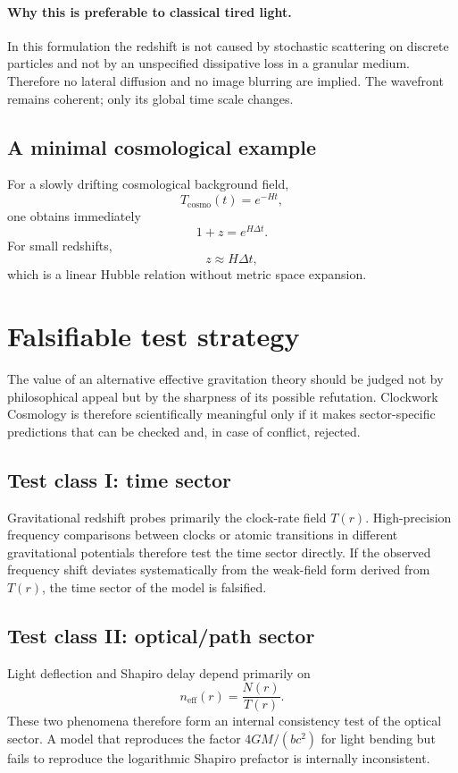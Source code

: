 \documentclass[11pt,a4paper]{article}
\begin{document}
\paragraph{Why this is preferable to classical tired light.}
In this formulation the redshift is not caused by stochastic scattering on discrete particles and not by an unspecified dissipative loss in a granular medium. Therefore no lateral diffusion and no image blurring are implied. The wavefront remains coherent; only its global time scale changes.

\subsection{A minimal cosmological example}
For a slowly drifting cosmological background field,
\begin{equation}
 T_{\text{cosmo}}(t)=e^{-Ht},
\end{equation}
one obtains immediately
\begin{equation}
 1+z = e^{H\Delta t}.
\end{equation}
For small redshifts,
\begin{equation}
 z \approx H\Delta t,
\end{equation}
which is a linear Hubble relation without metric space expansion.

\section{Falsifiable test strategy}
The value of an alternative effective gravitation theory should be judged not by philosophical appeal but by the sharpness of its possible refutation. Clockwork Cosmology is therefore scientifically meaningful only if it makes sector-specific predictions that can be checked and, in case of conflict, rejected.

\subsection{Test class I: time sector}
Gravitational redshift probes primarily the clock-rate field $T(r)$. High-precision frequency comparisons between clocks or atomic transitions in different gravitational potentials therefore test the time sector directly. If the observed frequency shift deviates systematically from the weak-field form derived from $T(r)$, the time sector of the model is falsified.

\subsection{Test class II: optical/path sector}
Light deflection and Shapiro delay depend primarily on
\begin{equation}
 n_{\text{eff}}(r)=\frac{N(r)}{T(r)}.
\end{equation}
These two phenomena therefore form an internal consistency test of the optical sector. A model that reproduces the factor $4GM/(bc^2)$ for light bending but fails to reproduce the logarithmic Shapiro prefactor is internally inconsistent.
\end{document}
